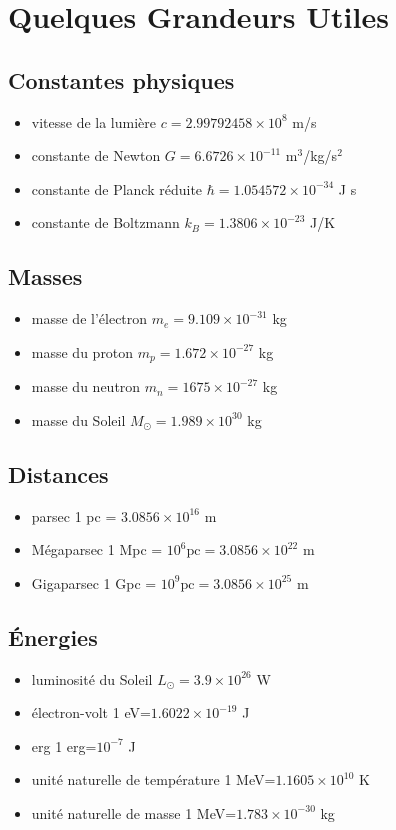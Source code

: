 \chapter*{Quelques Grandeurs Utiles}

\section{Constantes physiques}
\begin{itemize}
\item vitesse de la lumière $c=2.99792458 \times 10^8$ m/s
\item constante de Newton $G=6.6726 \times 10^{-11}$ m$^3$/kg/s$^2$
\item constante de Planck réduite $\hbar = 1.054572\times 10^{-34}$ J s
\item constante de Boltzmann $k_B=1.3806 \times 10^{-23}$ J/K
\end{itemize}

\section{Masses}
\begin{itemize}
\item masse de l'électron $m_e=9.109\times10^{-31}$ kg
\item masse du proton $m_p=1.672\times10^{-27}$ kg
\item masse du neutron $m_n=1675\times10^{-27}$ kg
\item masse du Soleil $M_\odot=1.989\times 10^{30}$ kg
\end{itemize}

\section{Distances}
\begin{itemize}
\item parsec 1 pc = $3.0856\times 10^{16}$ m
\item Mégaparsec 1 Mpc = $10^6\mathrm{pc}=3.0856\times 10^{22}$ m
\item Gigaparsec 1 Gpc = $10^9\mathrm{pc}=3.0856\times 10^{25}$ m
\end{itemize}

\section{Énergies}
\begin{itemize}
\item luminosité du Soleil $L_\odot=3.9\times 10^{26}$ W
\item électron-volt 1 eV=$1.6022\times 10^{-19}$ J 
\item erg 1 erg=$10^{-7}$ J
\item unité naturelle de température 1 MeV=$1.1605\times 10^{10}$ K
\item unité naturelle de masse 1 MeV=$1.783\times10^{-30}$ kg
\end{itemize}

